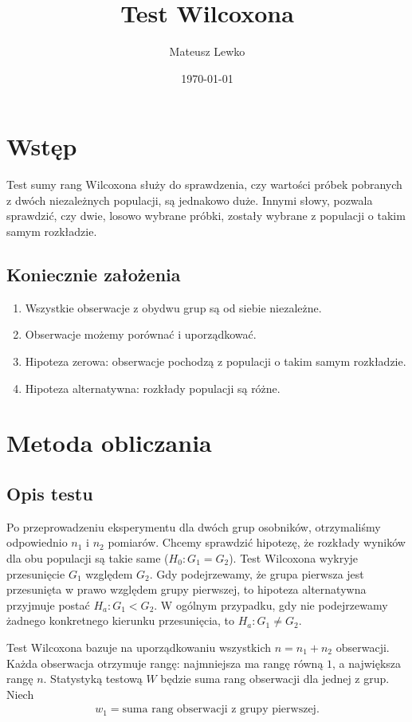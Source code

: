 \documentclass[a4paper]{article}
\title{Test Wilcoxona}
\author{Mateusz Lewko}
\date{\today}
\begin{document}
\maketitle

\section{Wstęp}

 Test sumy rang Wilcoxona służy do sprawdzenia, czy wartości próbek pobranych z dwóch niezależnych populacji, są jednakowo duże. Innymi słowy, pozwala sprawdzić, czy dwie, losowo wybrane próbki, zostały wybrane z populacji o takim samym rozkładzie. 

\subsection{Koniecznie założenia}
\begin{enumerate}
    \item Wszystkie obserwacje z obydwu grup są od siebie niezależne.
    \item Obserwacje możemy porównać i uporządkować.
    \item Hipoteza zerowa: obserwacje pochodzą z populacji o takim samym rozkładzie.
    \item Hipoteza alternatywna: rozkłady populacji są różne.
\end{enumerate}

\section{Metoda obliczania}
\subsection{Opis testu}
Po przeprowadzeniu eksperymentu dla dwóch grup osobników, otrzymaliśmy odpowiednio $n_1$ i $n_2$ pomiarów. Chcemy sprawdzić hipotezę, że rozkłady wyników dla obu populacji są takie same ($H_0 : G_1 = G_2$). Test Wilcoxona wykryje przesunięcie $G_1$ względem $G_2$. Gdy podejrzewamy, że grupa pierwsza jest przesunięta w prawo względem grupy pierwszej, to hipoteza alternatywna przyjmuje postać $H_a: G_1 < G_2$. W ogólnym przypadku, gdy nie podejrzewamy żadnego konkretnego kierunku przesunięcia, to  $H_a: G_1 \neq G_2$.

Test Wilcoxona bazuje na uporządkowaniu wszystkich $n = n_1 + n_2$ obserwacji. Każda obserwacja otrzymuje rangę: najmniejsza ma rangę równą $1$, a największa rangę $n$. Statystyką testową $W$ będzie suma rang obserwacji dla jednej z grup. Niech 
\begin{align}
    w_1 = \text{suma rang obserwacji z grupy pierwszej.}
\end{align}
\end{document}
